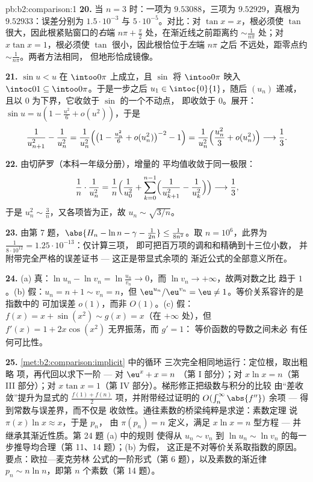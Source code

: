 \begin{solution}{pb:b2:comparison:1}
\textbf{20.} 当 $n = 3$ 时：一项为 $9.53088$，三项为
$9.52929$，真根为 $9.52933$：误差分别为 $1.5\cdot10^{-3}$ 与
$5\cdot10^{-5}$。对比：对 $\tan x = x$，根必须使
$\tan$ 很大，因此根紧贴窗口的\emph{右}端 $n\pi +
\frac\pi2$ 处，在渐近线之前距离约 $\sim\frac1{n\pi}$
处；对 $x\tan x = 1$，根必须使
$\tan$ 很小，因此根恰位于\emph{左}端 $n\pi$ 之后
不远处，距零点约 $\sim\frac1{n\pi}$。两者方法相同，
但地形恰成镜像。

\textbf{21.} $\sin u < u$ 在 $\intoo0\pi$ 上成立，且 $\sin$ 将
$\intoo0\pi$ 映入 $\intoc01 \subseteq \intoo0\pi$。于是一步之后
$u_1 \in \intoc{0}{1}$，随后 $(u_n)$ 递减，
且以 $0$ 为下界，它收敛于 $\sin$ 的一个不动点，
即收敛于 $0$。展开：$\sin u = u(1 - \frac{u^2}6 +
o(u^2))$，于是
\[
\frac{1}{u_{n+1}^2} - \frac1{u_n^2}
= \frac{1}{u_n^2}\Bigl(\bigl(1 - \tfrac{u_n^2}6 +
o(u_n^2)\bigr)^{-2} - 1\Bigr)
= \frac{1}{u_n^2}\Bigl(\frac{u_n^2}{3} + o(u_n^2)\Bigr)
\longrightarrow \frac13 .
\]

\textbf{22.} 由切萨罗（本科一年级分册），增量的
平均值收敛于同一极限：
\[
\frac{1}{n}\cdot\frac{1}{u_n^2}
= \frac1n\Bigl(\frac1{u_0^2} + \sum_{k=0}^{n-1}
\Bigl(\frac1{u_{k+1}^2} - \frac1{u_k^2}\Bigr)\Bigr)
\longrightarrow \frac13 ,
\]
于是 $u_n^2 \sim \frac3n$，又各项皆为正，故 $u_n
\sim \sqrt{3/n}$。

\textbf{23.} 由第 7 题，$\abs{H_n - \ln n - \gamma -
\frac1{2n}} \leq \frac1{8n^2}$。取 $n = 10^6$，此界为
$\frac{1}{8\cdot10^{12}} = 1.25\cdot10^{-13}$：仅计算三项，
即可把百万项的调和和精确到十三位小数，
并附带完全严格的误差证书 --- 这正是带显式余项的
渐近公式的全部意义所在。

\textbf{24.} (a) 真：$\ln u_n - \ln v_n = \ln\frac{u_n}{v_n}
\to 0$，而 $\ln v_n \to +\infty$，故两对数之比
趋于 $1$。(b) 假：$u_n = n + 1 \sim v_n = n$，但
$\eu^{u_n}/\eu^{v_n} = \eu \neq 1$。等价关系容许的是指数中的
可加误差 $o(1)$，而非 $O(1)$。(c) 假：
$f(x) = x + \sin(x^2) \sim g(x) = x$（在 $+\infty$ 处），但 $f'(x)
= 1 + 2x\cos(x^2)$ 无界振荡，而 $g' = 1$：
等价函数的导数之间未必
有任何可比性。

\textbf{25.} \cref{met:b2:comparison:implicit} 中的循环
三次完全相同地运行：定位根，取出粗略
项，再代回以求下一阶 --- 对 $\eu^x + x = n$
（第 I 部分）；对 $x\ln x = n$（第 III 部分）；对 $x\tan x = 1$（第
IV 部分）。梯形修正把级数与积分的比较
由“差收敛”提升为显式的
$\frac{f(1) + f(n)}2$ 项，并附带经过证明的 $O(\int_n^\infty
\abs{f''})$ 余项 --- 得到常数与误差界，而不仅是
收敛性。通往素数的桥梁纯粹是求逆：素数定理
说 $\pi(x)\ln x \approx x$，于是 $p_n$，
由 $\pi(p_n) = n$ 定义，满足 $x\ln x = n$ 型方程 ---
并继承其渐近性质。第 24 题 (a) 中的规则
使得从 $u_n \sim v_n$ 到 $\ln u_n \sim
\ln v_n$ 的每一步推导均合理（第 11、14 题）；(b) 为假，
这正是不对等价关系取指数的原因。要点：欧拉—麦克劳林
公式的一阶形式（第 6 题），以及素数的渐近律
$p_n \sim n\ln n$，即第 $n$ 个素数（第 14 题）。
\end{solution}
